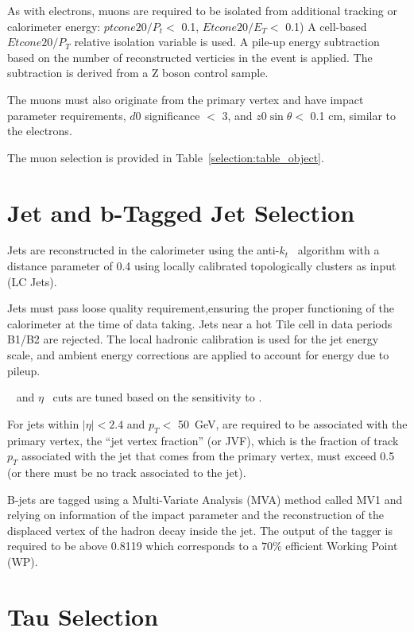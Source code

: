 As with electrons, muons are required to be isolated from 
additional tracking or calorimeter energy: $ptcone20/P_t <$ 0.1, $Etcone20/E_T <$ 0.1) A cell-based $Etcone20/P_T$ relative
isolation variable is used. A pile-up energy subtraction based 
on the number of reconstructed verticies in the event is applied. The
subtraction is derived from a Z boson control sample.


The muons must also originate from the primary vertex and have impact parameter requirements, $d0$ significance $<$ 3, and $z0\sin{\theta} <$ 0.1 cm, similar to the electrons. 


The muon selection is provided in Table~\ref{selection:table_object}. 

\section{Jet and b-Tagged Jet Selection}

Jets are reconstructed in the calorimeter using the anti-$k_t$~\cite{Cacciari:2008gp} algorithm
with a distance parameter of 0.4 using locally calibrated
topologically clusters as input (LC Jets). 

Jets must pass loose quality requirement,ensuring the proper
functioning of the calorimeter at the time of data taking. Jets near a hot Tile cell in data periods
B1/B2 are rejected. The local hadronic calibration is used for
the jet energy scale, and ambient energy corrections are applied to account
for energy due to pileup.

\pt~ and $\eta$~ cuts are tuned based on the sensitivity to \tth. 

For jets within $|\eta| < 2.4$ and $p_T <$ 50~GeV, are required to be
associated with the primary vertex, the ``jet vertex fraction'' (or JVF),
which is the fraction of track $p_T$ associated with the jet that comes from the primary vertex,
must exceed 0.5 (or there must be no track associated to the jet). 

B-jets are tagged using a Multi-Variate Analysis (MVA) method called MV1 and relying on information
of the impact parameter and the reconstruction of the displaced vertex of the
hadron decay inside the jet\cite{ATLAS-CONF-2011-102}.
The output of the tagger is required to be above 0.8119 which corresponds to a $70\%$ efficient Working Point (WP).

\section{Tau Selection} 

